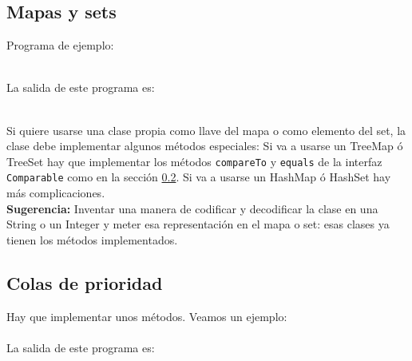\documentclass[10pt,letterpaper,twocolumn]{article}
\newcommand{\codigofuente}[1]{

\dotfill
}
\begin{document}
\subsection{Mapas y sets}
Programa de ejemplo:
\codigofuente{./src/java/maps_sets.java} \\
La salida de este programa es: \\
\bigskip
\ttfamily
{}
\\ \normalfont\normalsize
\bigskip

Si quiere usarse una clase propia como llave del mapa o como elemento del set, la clase debe implementar
algunos métodos especiales: Si va a usarse un TreeMap ó TreeSet hay que implementar los métodos \texttt{compareTo} y
\texttt{equals} de la interfaz \texttt{Comparable} como en la sección \ref{colas_de_prioridad_java}. Si va a usarse
un HashMap ó HashSet hay más complicaciones.\\
\smallskip
\textbf{Sugerencia:} Inventar una manera de codificar y decodificar la clase en una String o un Integer y meter esa representación en el mapa o set: esas clases ya tienen los métodos implementados.

\subsection{Colas de prioridad}
\label{colas_de_prioridad_java}
Hay que implementar unos métodos. Veamos un ejemplo: \\
\codigofuente{./src/java/priority_queue.java}\\
La salida de este programa es: \\

\ttfamily
{}
 \normalfont\normalsize
\end{document}
